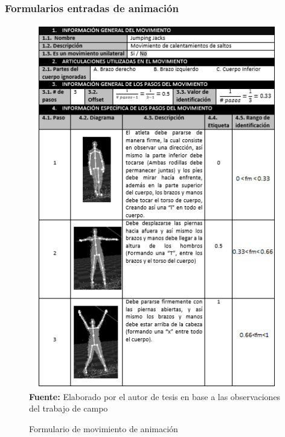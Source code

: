 \subsubsection{Formularios entradas de animaci\'on}
\begin{figure}[H]
	\caption{Formulario de movimiento de animaci\'on}
	\label{fig:frmMovCheer}
	\centering	\includegraphics[width=445px,height=600px]{graphics/resultados/movimientoCheerleader.PNG} \\
	\textbf{Fuente:} Elaborado por el autor de tesis en base a las observaciones del trabajo de campo
\end{figure}
